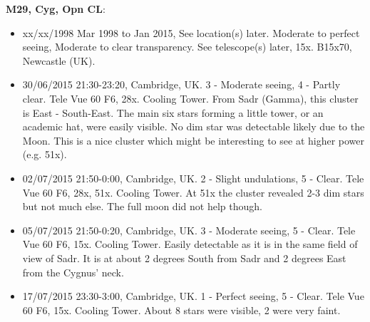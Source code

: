 {\bf M29, Cyg, Opn CL}:
\begin{itemize}
\item xx/xx/1998 Mar 1998 to Jan 2015, See location(s) later. Moderate to perfect seeing, Moderate to clear transparency. See telescope(s) later, 15x. B15x70, Newcastle (UK).
\item 30/06/2015 21:30-23:20, Cambridge, UK. 3 - Moderate seeing, 4 - Partly clear. Tele Vue 60 F6, 28x. Cooling Tower. From Sadr (Gamma), this cluster is East - South-East. The main six stars forming a little tower, or an academic hat, were easily visible. No dim star was detectable likely due to the Moon. This is a nice cluster which might be interesting to see at higher power (e.g. 51x). 
\item 02/07/2015 21:50-0:00, Cambridge, UK. 2 - Slight undulations, 5 - Clear. Tele Vue 60 F6, 28x, 51x. Cooling Tower. At 51x the cluster revealed 2-3 dim stars but not much else. The full moon did not help though.
\item 05/07/2015 21:50-0:20, Cambridge, UK. 3 - Moderate seeing, 5 - Clear. Tele Vue 60 F6, 15x. Cooling Tower. Easily detectable as it is in the same field of view of Sadr. It is at about 2 degrees South from Sadr and 2 degrees East from the Cygnus' neck.
\item 17/07/2015 23:30-3:00, Cambridge, UK. 1 - Perfect seeing, 5 - Clear. Tele Vue 60 F6, 15x. Cooling Tower. About 8 stars were visible, 2 were very faint.
\end{itemize}
